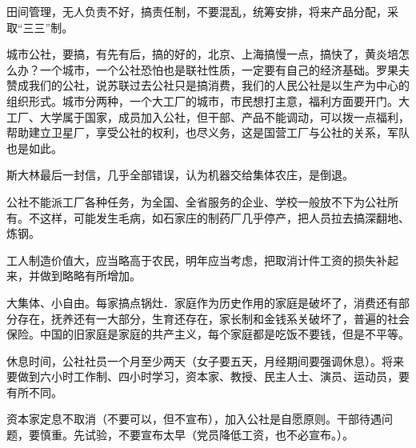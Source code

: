 田间管理，无人负责不好，搞责任制，不要混乱，统筹安排，将来产品分配，采取“三三”制。

城市公社，要搞，有先有后，搞的好的，北京、上海搞慢一点，搞快了，黄炎培怎么办？一个城市，一个公社恐怕也是联社性质，一定要有自己的经济基础。罗果夫赞成我们的公社，说苏联过去公社只是搞消费，我们的人民公社是以生产为中心的组织形式。城市分两种，一个大工厂的城市，市民想打主意，福利方面要开门。大工厂、大学属于国家，成员加入公社，但干部、产品不能调动，可以拨一点福利，帮助建立卫星厂，享受公社的权利，也尽义务，这是国营工厂与公社的关系，军队也是如此。

斯大林最后一封信，几乎全部错误，认为机器交给集体农庄，是倒退。

公社不能派工厂各种任务，为全国、全省服务的企业、学校一般放不下为公社所有。不这样，可能发生毛病，如石家庄的制药厂几乎停产，把人员拉去搞深翻地、炼钢。

工人制造价值大，应当略高于农民，明年应当考虑，把取消计件工资的损失补起来，并做到略略有所增加。

大集体、小自由。每家搞点锅灶．家庭作为历史作用的家庭是破坏了，消费还有部分存在，抚养还有一大部分，生育还存在，家长制和金钱系关破坏了，普遍的社会保险。中国的旧家庭是家庭的共产主义，每个家庭都是吃饭不要钱，但是不平等。

休息时间，公社社员一个月至少两天（女子要五天，月经期间要强调休息）。将来要做到六小时工作制、四小时学习，资本家、教授、民主人士、演员、运动员，要有所不同。

资本家定息不取消（不要可以，但不宣布），加入公社是自愿原则。干部待遇问题，要慎重。先试验，不要宣布太早（党员降低工资，也不必宣布。）。


